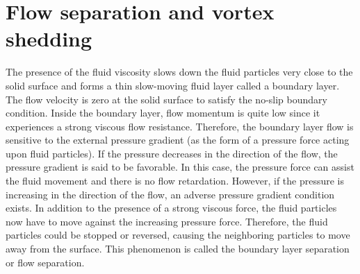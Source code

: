 \section{Flow separation and vortex shedding}
The presence of the fluid viscosity slows down the fluid particles very close to the solid surface and forms a thin slow-moving fluid layer called a boundary layer. The flow velocity is zero at the solid surface to satisfy the no-slip boundary condition. Inside the boundary layer, flow momentum is quite low since it experiences a strong viscous flow resistance. Therefore, the boundary layer flow is sensitive to the external pressure gradient (as the form of a pressure force acting upon fluid particles). If the pressure decreases in the direction of the flow, the pressure gradient is said to be favorable. In this case, the pressure force can assist the fluid movement and there is no flow retardation. However, if the pressure is increasing in the direction of the flow, an adverse pressure gradient condition exists. In addition to the presence of a strong viscous force, the fluid particles now have to move against the increasing pressure force. Therefore, the fluid particles could be stopped or reversed, causing the neighboring particles to move away from the surface. This phenomenon is called the boundary layer separation or flow separation. 
 













